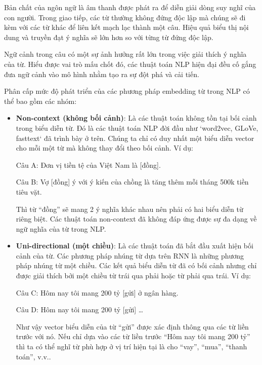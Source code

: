 Bản chất của ngôn ngữ là âm thanh được phát ra để diễn giải dòng suy nghĩ của con người. Trong giao tiếp, các từ thường không đứng độc lập mà chúng sẽ đi kèm với các từ khác để liên kết mạch lạc thành một câu. Hiệu quả biểu thị nội dung và truyền đạt ý nghĩa sẽ lớn hơn so với từng từ đứng độc lập\cite{webpage20}.

Ngữ cảnh trong câu có một sự ảnh hưởng rất lớn trong việc giải thích ý nghĩa của từ. Hiểu được vai trò mấu chốt đó, các thuật toán NLP hiện đại đều cố gắng đưa ngữ cảnh vào mô hình nhằm tạo ra sự đột phá và cải tiến.

Phân cấp mức độ phát triển của các phương pháp embedding từ trong NLP có thể bao gồm các nhóm:
\begin{itemize}
    \item \textbf{Non-context (không bối cảnh)}: Là các thuật toán không tồn tại bối cảnh trong biểu diễn từ. Đó là các thuật toán NLP đời đầu như `word2vec, GLoVe, fasttext` đã trình bày ở trên. Chúng ta chỉ có duy nhất một biểu diễn vector cho mỗi một từ mà không thay đổi theo bối cảnh. Ví dụ:

          Câu A: Đơn vị tiền tệ của Việt Nam là [đồng].

          Câu B: Vợ [đồng] ý với ý kiến của chồng là tăng thêm mỗi tháng 500k tiền tiêu vặt.

          Thì từ ``đồng'' sẽ mang 2 ý nghĩa khác nhau nên phải có hai biểu diễn từ riêng biệt. Các thuật toán non-context đã không đáp ứng được sự đa dạng về ngữ nghĩa của từ trong NLP.

    \item \textbf{Uni-directional (một chiều)}: Là các thuật toán đã bắt đầu xuất hiện bối cảnh của từ. Các phương pháp nhúng từ dựa trên RNN là những phương pháp nhúng từ một chiều. Các kết quả biểu diễn từ đã có bối cảnh nhưng chỉ được giải thích bởi một chiều từ trái qua phải hoặc từ phải qua trái. Ví dụ:

          Câu C: Hôm nay tôi mang 200 tỷ [gửi] ở ngân hàng.

          Câu D: Hôm nay tôi mang 200 tỷ [gửi] \dots

          Như vậy vector biểu diễn của từ ``gửi'' được xác định thông qua các từ liền trước với nó. Nếu chỉ dựa vào các từ liền trước ``Hôm nay tôi mang 200 tỷ'' thì ta có thể nghĩ từ phù hợp ở vị trí hiện tại là cho ``vay'', ``mua'', ``thanh toán'', v.v..


\end{itemize}
